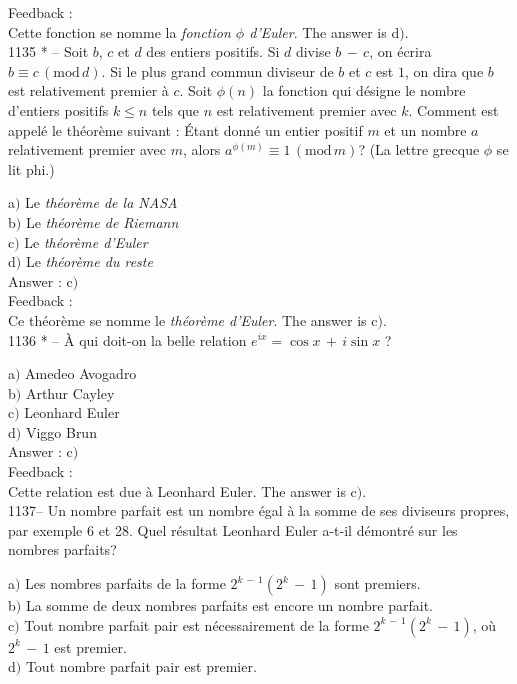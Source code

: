 \documentclass[letterpaper, 12pt]{article}
\begin{document}
Feedback : \\
Cette fonction se nomme la {\sl fonction $\phi$ d'Euler}. The answer is
d$)$. \\

1135 * -- Soit $b$, $c$ et $d$ des entiers positifs. Si $d$ divise
$b\,-\,c$, on \'ecrira $b\equiv c\,(\mathrm{mod}\,d)$. Si le plus
grand commun diviseur de $b$ et $c$ est $1$, on dira que $b$ est
relativement premier \`a $c$. Soit $\phi(n)$ la fonction qui
d\'esigne le nombre d'entiers positifs $k\le n$ tels que $n$ est
relativement premier avec $k$. Comment est appel\'e le th\'eor\`eme
suivant : \og\'Etant donn\'e un entier positif $m$ et un nombre $a$
relativement premier avec $m$, alors $a^{\phi(m)}\equiv
1\,(\mathrm{mod}\,m)$\fg ? (La lettre grecque $\phi$ se lit phi.)

a$)$ Le {\sl th\'eor\`eme de la NASA} \\
b$)$ Le {\sl th\'eor\`eme de Riemann}  \\
c$)$ Le {\sl th\'eor\`eme d'Euler}   \\
d$)$ Le {\sl th\'eor\`eme du reste}  \\

Answer : c$)$\\

Feedback : \\
Ce th\'eor\`eme se nomme le {\sl th\'eor\`eme d'Euler}. The answer is
c$)$. \\

1136 * -- \`A qui doit-on la belle relation $e^{ix}=\cos x\,+\,i\sin
x$ ?

a$)$ Amedeo Avogadro \\
b$)$ Arthur Cayley  \\
c$)$ Leonhard Euler   \\
d$)$ Viggo Brun  \\

Answer : c$)$\\

Feedback : \\
Cette relation est due \`a {Leonhard Euler}. The answer is c$)$. \\

1137-- Un nombre parfait est un nombre \'egal \`a la somme de ses
diviseurs propres, par exemple 6 et 28. Quel r\'esultat Leonhard
Euler a-t-il d\'emontr\'e sur les nombres parfaits?

a$)$ Les nombres parfaits de la forme $2^{k\,-\,1}(2^k\,-\,1)$ sont
premiers.  \\
b$)$ La somme de deux nombres parfaits est encore un nombre parfait. \\
c$)$ Tout nombre parfait pair est n\'ecessairement de la forme
$2^{k\,-\,1}(2^k\,-\,1)$, o\`u $2^k\,-\,1$ est premier. \\
d$)$ Tout nombre parfait pair est premier. \\
\end{document}
